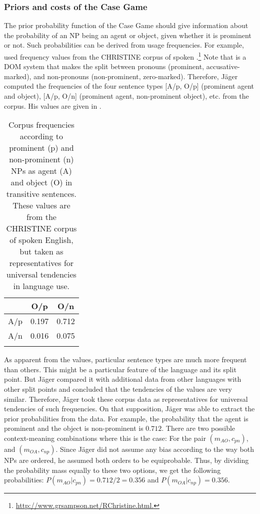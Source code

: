 \documentclass[output=paper,hidelinks]{langscibook}
\begin{document}
\subsubsection{Priors and costs of the Case Game}

The prior probability function of the Case Game should give information about the probability of an NP being an agent or object, given whether it is prominent or not. Such probabilities can be derived from usage frequencies. For example, \citet{Jaeger07} used frequency values from the CHRISTINE corpus of spoken .\footnote{\url{http://www.grsampson.net/RChristine.html.}} Note that  is a DOM system that makes the split between pronouns (prominent, accusative-marked), and non-pronouns (non-prominent, zero-marked). Therefore,  Jäger computed the frequencies of the four sentence types [A/p, O/p] (prominent agent and object), [A/p, O/n] (prominent agent, non-prominent object), etc. from the corpus. His values are given in .

\begin{table}[t]
\caption{Corpus frequencies according to prominent (p) and non-prominent (n) NPs as agent (A) and object (O) in transitive sentences. These values are from the CHRISTINE corpus of spoken English, but taken as representatives for universal tendencies in language use.}
\label{tab:1:frequencies}
 \begin{tabular}{ccc} 
  \lsptoprule
            & O/p & O/n\\ 
  \midrule
  A/p  &   0.197 &    0.712 \\
  A/n  &   0.016 &   0.075 \\
  \lspbottomrule
 \end{tabular}
\end{table}

As apparent from the values, particular sentence types are much more frequent than others. This might be a particular feature of the  language and its split point. But Jäger compared it with additional data from other languages with other split points and concluded that the tendencies of the values are very similar. Therefore,  Jäger took these corpus data as representatives for universal tendencies of such frequencies.
On that supposition, Jäger was able to extract the prior probabilities from the data. For example, the probability that the agent is prominent and the object is non-prominent is $0.712$. There are two possible context-meaning combinations where this is the case: For the pair $(m_{AO}, c_{pn})$, and $(m_{OA}, c_{np})$. Since  Jäger did not assume any bias according to the way both NPs are ordered, he assumed both orders to be equiprobable. 
Thus, by dividing the probability mass equally to these two options, we get the following probabilities:
$P(m_{AO}|c_{pn}) = 0.712/2 = 0.356$ and $P(m_{OA}|c_{np}) = 0.356$.
\end{document}
